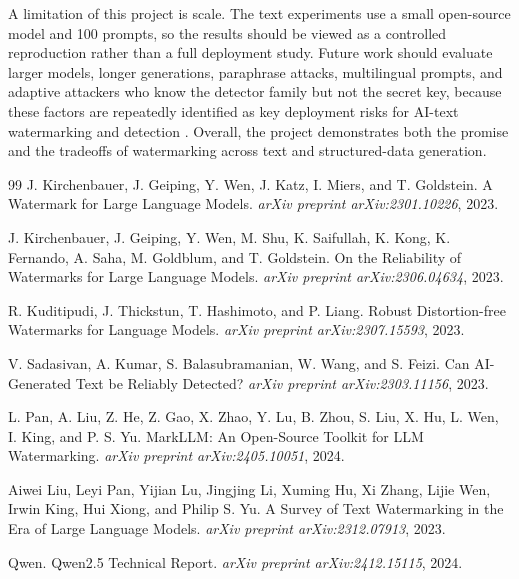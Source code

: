 \documentclass[11pt]{article}
\begin{document}
A limitation of this project is scale.
The text experiments use a small open-source model and 100 prompts, so the results should be viewed as a controlled reproduction rather than a full deployment study.
Future work should evaluate larger models, longer generations, paraphrase attacks, multilingual prompts, and adaptive attackers who know the detector family but not the secret key, because these factors are repeatedly identified as key deployment risks for AI-text watermarking and detection \cite{kirchenbauer_reliability2023,sadasivan2023}.
Overall, the project demonstrates both the promise and the tradeoffs of watermarking across text and structured-data generation.

\begin{thebibliography}{99}
J. Kirchenbauer, J. Geiping, Y. Wen, J. Katz, I. Miers, and T. Goldstein.
\newblock A Watermark for Large Language Models.
\newblock \emph{arXiv preprint arXiv:2301.10226}, 2023.

J. Kirchenbauer, J. Geiping, Y. Wen, M. Shu, K. Saifullah, K. Kong, K. Fernando, A. Saha, M. Goldblum, and T. Goldstein.
\newblock On the Reliability of Watermarks for Large Language Models.
\newblock \emph{arXiv preprint arXiv:2306.04634}, 2023.

R. Kuditipudi, J. Thickstun, T. Hashimoto, and P. Liang.
\newblock Robust Distortion-free Watermarks for Language Models.
\newblock \emph{arXiv preprint arXiv:2307.15593}, 2023.

V. Sadasivan, A. Kumar, S. Balasubramanian, W. Wang, and S. Feizi.
\newblock Can AI-Generated Text be Reliably Detected?
\newblock \emph{arXiv preprint arXiv:2303.11156}, 2023.

L. Pan, A. Liu, Z. He, Z. Gao, X. Zhao, Y. Lu, B. Zhou, S. Liu, X. Hu, L. Wen, I. King, and P. S. Yu.
\newblock MarkLLM: An Open-Source Toolkit for LLM Watermarking.
\newblock \emph{arXiv preprint arXiv:2405.10051}, 2024.

Aiwei Liu, Leyi Pan, Yijian Lu, Jingjing Li, Xuming Hu, Xi Zhang, Lijie Wen, Irwin King, Hui Xiong, and Philip S. Yu.
\newblock A Survey of Text Watermarking in the Era of Large Language Models.
\newblock \emph{arXiv preprint arXiv:2312.07913}, 2023.

Qwen.
\newblock Qwen2.5 Technical Report.
\newblock \emph{arXiv preprint arXiv:2412.15115}, 2024.
\end{thebibliography}
\end{document}
